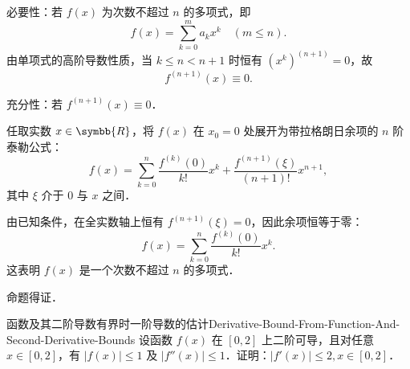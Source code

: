 \begin{myproof}
    必要性：若 $f(x)$ 为次数不超过 $n$ 的多项式，即
    \begin{equation}
        f(x) = \sum_{k=0}^m a_k x^k \quad (m \leqslant n).
    \end{equation}
    由单项式的高阶导数性质，当 $k \leqslant n < n+1$ 时恒有 $(x^k)^{(n+1)} = 0$，故
    \begin{equation}
        f^{(n+1)}(x) \equiv 0.
    \end{equation}

    充分性：若 $f^{(n+1)}(x) \equiv 0$．

    任取实数 $x \in \symbb{R}$，将 $f(x)$ 在 $x_0 = 0$ 处展开为带拉格朗日余项的 $n$ 阶泰勒公式：
    \begin{equation}
        f(x) = \sum_{k=0}^n \frac{f^{(k)}(0)}{k!} x^k + \frac{f^{(n+1)}(\xi)}{(n+1)!} x^{n+1},
    \end{equation}
    其中 $\xi$ 介于 $0$ 与 $x$ 之间．

    由已知条件，在全实数轴上恒有 $f^{(n+1)}(\xi) = 0$，因此余项恒等于零：
    \begin{equation}
        f(x) = \sum_{k=0}^n \frac{f^{(k)}(0)}{k!} x^k.
    \end{equation}
    这表明 $f(x)$ 是一个次数不超过 $n$ 的多项式．

    命题得证．
\end{myproof}

\begin{problem}{函数及其二阶导数有界时一阶导数的估计}{Derivative-Bound-From-Function-And-Second-Derivative-Bounds}
    设函数 $f(x)$ 在 $[0, 2]$ 上二阶可导，且对任意 $x \in [0, 2]$，有 $|f(x)| \leqslant 1$ 及 $|f''(x)| \leqslant 1$．证明：$|f'(x)| \leqslant 2, x \in [0, 2]$．
\end{problem}

